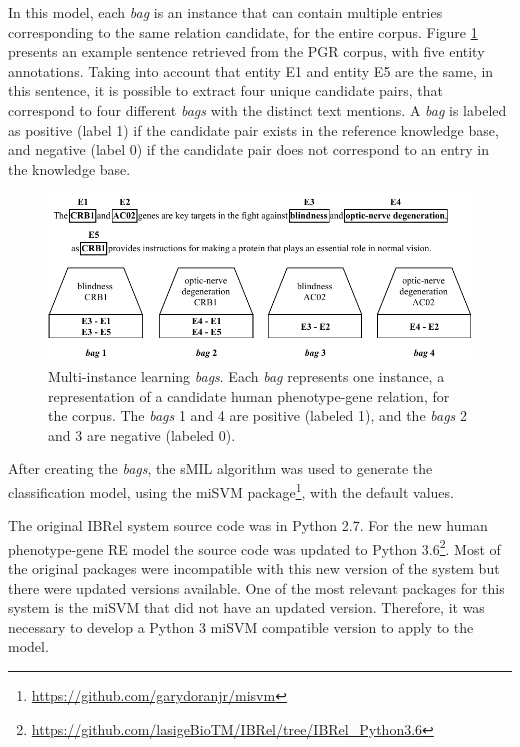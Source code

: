 In this model, each \textit{bag} is an instance that can contain multiple entries corresponding to the same relation candidate, for the entire corpus. Figure \ref{figure:ibrel_bags} presents an example sentence retrieved from the PGR corpus, with five entity annotations. Taking into account that entity E1 and entity E5 are the same, in this sentence, it is possible to extract four unique candidate pairs, that correspond to four different \textit{bags} with the distinct text mentions. A \textit{bag} is labeled as positive (label 1) if the candidate pair exists in the reference knowledge base, and negative (label 0) if the candidate pair does not correspond to an entry in the knowledge base.

\begin{figure}[ht]
\captionsetup{font=small}
\centering
\includegraphics[width=15cm]{images/ibrel_bags.pdf}
\fontsize{9}{10.8}\caption[Multi-instance Learning \textit{Bags}]{Multi-instance learning \textit{bags}. Each \textit{bag} represents one instance, a representation of a candidate human phenotype-gene relation, for the corpus. The \textit{bags} 1 and 4 are positive (labeled 1), and the \textit{bags} 2 and 3 are negative (labeled 0).}
\label{figure:ibrel_bags}
\end{figure}

After creating the \textit{bags}, the sMIL algorithm was used to generate the classification model, using the miSVM package\footnote{\url{https://github.com/garydoranjr/misvm}}, with the default values. 

The original IBRel system source code was in Python 2.7. For the new human phenotype-gene RE model the source code was updated to Python 3.6\footnote{\url{https://github.com/lasigeBioTM/IBRel/tree/IBRel_Python3.6}}. Most of the original packages were incompatible with this new version of the system but there were updated versions available. One of the most relevant packages for this system is the miSVM that did not have an updated version. Therefore, it was necessary to develop a Python 3 miSVM compatible version to apply to the model. 

